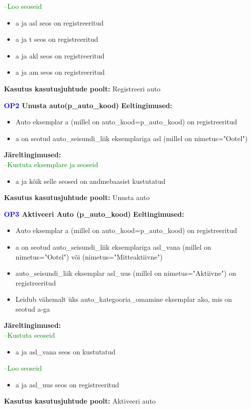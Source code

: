 \textcolor{green}{--Loo seoseid}
\begin{itemize}
	\item a ja asl seos on registreeritud
	\item a ja t seos on registreeritud
	\item a ja akl seos on registreeritud
	\item a ja am seos on registreeritud
\end{itemize}
\textbf{Kasutus kasutusjuhtude poolt:} Registreeri auto \\ \hfill

\textbf{\textcolor{blue}{OP2} Unusta auto(p\_auto\_kood)}
\textbf{Eeltingimused:}
\begin{itemize}
	\item Auto eksemplar a (millel on auto\_kood=p\_auto\_kood) on registreeritud
	\item a on seotud auto\_seisundi\_liik eksemplariga asl (millel on nimetus="Ootel")
\end{itemize}
\textbf{Järeltingimused:} \\
\textcolor{green}{--Kustuta eksemplare ja seoseid}
\begin{itemize}
	\item a ja kõik selle seosed on andmebaasist kustutatud 
\end{itemize}
\textbf{Kasutus kasutusjuhtude poolt:} Unusta auto \\ \hfill

\textbf{\textcolor{blue}{OP3} Aktiveeri Auto (p\_auto\_kood)}
\textbf{Eeltingimused:}
\begin{itemize}
	\item Auto eksemplar a (millel on auto\_kood=p\_auto\_kood) on registreeritud
	\item a on seotud auto\_seisundi\_liik eksemplariga asl\_vana (millel on nimetus="Ootel") või (nimetus="Mitteaktiivne")
	\item auto\_seisundi\_liik eksemplar asl\_uus (millel on nimetus="Aktiivne") on registreeritud
	\item Leidub vähemalt üks auto\_kategooria\_omamine eksemplar ako, mis on seotud a-ga
\end{itemize}
\textbf{Järeltingimused:} \\
\textcolor{green}{--Kustuta seoseid}
\begin{itemize}
	\item a ja asl\_vana seos on kustutatud
\end{itemize}
\textcolor{green}{--Loo seoseid}
\begin{itemize}
	\item a ja asl\_uus seos on registreeritud
\end{itemize}
\textbf{Kasutus kasutusjuhtude poolt:} Aktiveeri auto \\ \hfill

